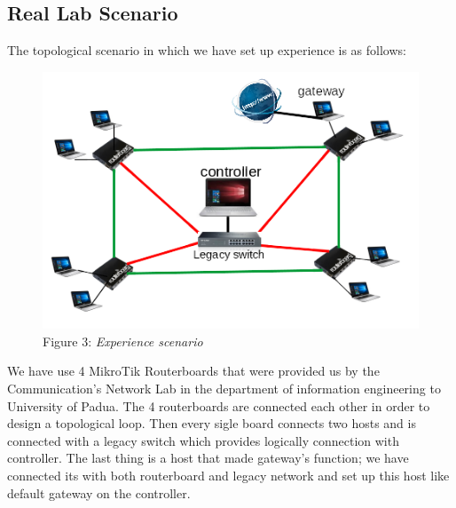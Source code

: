 \documentclass[article,10pt]{IEEEtran}
\begin{document}
\subsection{Real Lab Scenario}
The topological scenario in which we have set up experience is as follows:
\begin{figure}[!h]
 \centering
 \includegraphics[scale=0.70]{images/topo.png}
 {Figure 3: \emph{Experience scenario}}
 \label{fig:topo}
\end{figure}

We have use 4 MikroTik Routerboards that were provided us by the Communication's Network Lab in the department of information  engineering to 
University of Padua.
The 4 routerboards are connected each other in order to design a topological loop. Then every sigle board connects two hosts and is connected with a 
legacy switch which provides logically connection with controller.
The last thing is a host that made gateway's function; we have connected its with both routerboard and legacy network and set up this host like default 
gateway on the controller.
\end{document}
